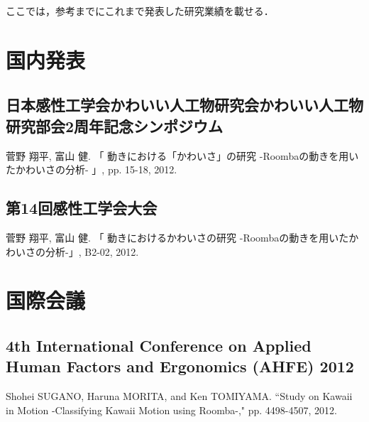 ここでは，参考までにこれまで発表した研究業績を載せる．

\section{国内発表}
\subsection{日本感性工学会かわいい人工物研究会かわいい人工物研究部会2周年記念シンポジウム}
菅野 翔平, 富山 健. 「 動きにおける「かわいさ」の研究 -Roombaの動きを用いたかわいさの分析- 」, pp. 15-18, 2012.

\subsection{第14回感性工学会大会}
菅野 翔平, 富山 健. 「 動きにおけるかわいさの研究 -Roombaの動きを用いたかわいさの分析-」, B2-02, 2012.

\section{国際会議}
\subsection{4th  International Conference on Applied Human Factors and Ergonomics (AHFE) 2012}
Shohei SUGANO, Haruna MORITA, and Ken TOMIYAMA. ``Study on Kawaii in Motion -Classifying Kawaii Motion using Roomba-," pp. 4498-4507, 2012.